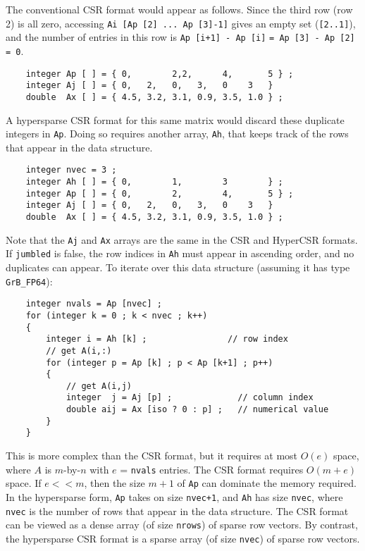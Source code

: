The conventional CSR format would appear as follows.  Since the third row (row
2) is all zero, accessing \verb'Ai [Ap [2] ... Ap [3]-1]' gives an empty set
(\verb'[2..1]'), and the number of entries in this row is
\verb'Ap [i+1] - Ap [i]' \verb'= Ap [3] - Ap [2] = 0'.

{\footnotesize
\begin{verbatim}
    integer Ap [ ] = { 0,        2,2,      4,       5 } ;
    integer Aj [ ] = { 0,   2,   0,   3,   0    3   }
    double  Ax [ ] = { 4.5, 3.2, 3.1, 0.9, 3.5, 1.0 } ; \end{verbatim} }

A hypersparse CSR format for this same matrix would discard
these duplicate integers in \verb'Ap'.  Doing so requires
another array, \verb'Ah', that keeps track of the rows that appear
in the data structure.

{\footnotesize
\begin{verbatim}
    integer nvec = 3 ;
    integer Ah [ ] = { 0,        1,        3        } ;
    integer Ap [ ] = { 0,        2,        4,       5 } ;
    integer Aj [ ] = { 0,   2,   0,   3,   0    3   }
    double  Ax [ ] = { 4.5, 3.2, 3.1, 0.9, 3.5, 1.0 } ; \end{verbatim} }

Note that the \verb'Aj' and \verb'Ax' arrays are the same in the CSR and
HyperCSR formats.  If \verb'jumbled' is false, the row indices in \verb'Ah'
must appear in ascending order, and no duplicates can appear.  To iterate over
this data structure (assuming it has type \verb'GrB_FP64'):

    {\footnotesize
    \begin{verbatim}
    integer nvals = Ap [nvec] ;
    for (integer k = 0 ; k < nvec ; k++)
    {
        integer i = Ah [k] ;                // row index
        // get A(i,:)
        for (integer p = Ap [k] ; p < Ap [k+1] ; p++)
        {
            // get A(i,j)
            integer  j = Aj [p] ;             // column index
            double aij = Ax [iso ? 0 : p] ;   // numerical value
        }
    } \end{verbatim}}

\vspace{-0.05in}
This is more complex than the CSR format, but it requires at most
$O(e)$ space, where $A$ is $m$-by-$n$ with $e$ = \verb'nvals' entries.  The
CSR format requires $O(m+e)$ space.  If $e << m$, then the size $m+1$
of \verb'Ap' can dominate the memory required.  In the hypersparse form,
\verb'Ap' takes on size \verb'nvec+1', and \verb'Ah' has size \verb'nvec',
where \verb'nvec' is the number of rows that appear in the data structure.
The CSR format can be viewed as a dense array (of size \verb'nrows')
of sparse row vectors.   By contrast, the hypersparse CSR format is a sparse
array (of size \verb'nvec') of sparse row vectors.

